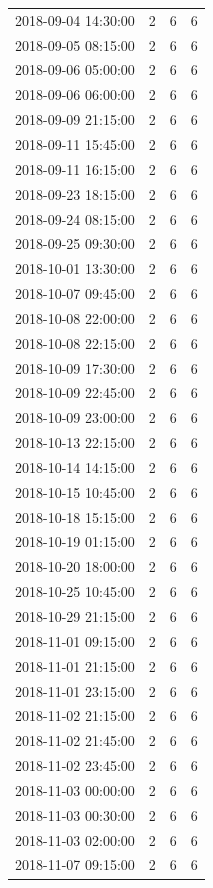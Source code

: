 \begin{tabular}{lrrr}
2018-09-04 14:30:00 & 2 & 6 & 6 \\
2018-09-05 08:15:00 & 2 & 6 & 6 \\
2018-09-06 05:00:00 & 2 & 6 & 6 \\
2018-09-06 06:00:00 & 2 & 6 & 6 \\
2018-09-09 21:15:00 & 2 & 6 & 6 \\
2018-09-11 15:45:00 & 2 & 6 & 6 \\
2018-09-11 16:15:00 & 2 & 6 & 6 \\
2018-09-23 18:15:00 & 2 & 6 & 6 \\
2018-09-24 08:15:00 & 2 & 6 & 6 \\
2018-09-25 09:30:00 & 2 & 6 & 6 \\
2018-10-01 13:30:00 & 2 & 6 & 6 \\
2018-10-07 09:45:00 & 2 & 6 & 6 \\
2018-10-08 22:00:00 & 2 & 6 & 6 \\
2018-10-08 22:15:00 & 2 & 6 & 6 \\
2018-10-09 17:30:00 & 2 & 6 & 6 \\
2018-10-09 22:45:00 & 2 & 6 & 6 \\
2018-10-09 23:00:00 & 2 & 6 & 6 \\
2018-10-13 22:15:00 & 2 & 6 & 6 \\
2018-10-14 14:15:00 & 2 & 6 & 6 \\
2018-10-15 10:45:00 & 2 & 6 & 6 \\
2018-10-18 15:15:00 & 2 & 6 & 6 \\
2018-10-19 01:15:00 & 2 & 6 & 6 \\
2018-10-20 18:00:00 & 2 & 6 & 6 \\
2018-10-25 10:45:00 & 2 & 6 & 6 \\
2018-10-29 21:15:00 & 2 & 6 & 6 \\
2018-11-01 09:15:00 & 2 & 6 & 6 \\
2018-11-01 21:15:00 & 2 & 6 & 6 \\
2018-11-01 23:15:00 & 2 & 6 & 6 \\
2018-11-02 21:15:00 & 2 & 6 & 6 \\
2018-11-02 21:45:00 & 2 & 6 & 6 \\
2018-11-02 23:45:00 & 2 & 6 & 6 \\
2018-11-03 00:00:00 & 2 & 6 & 6 \\
2018-11-03 00:30:00 & 2 & 6 & 6 \\
2018-11-03 02:00:00 & 2 & 6 & 6 \\
2018-11-07 09:15:00 & 2 & 6 & 6 \\

\end{tabular}
